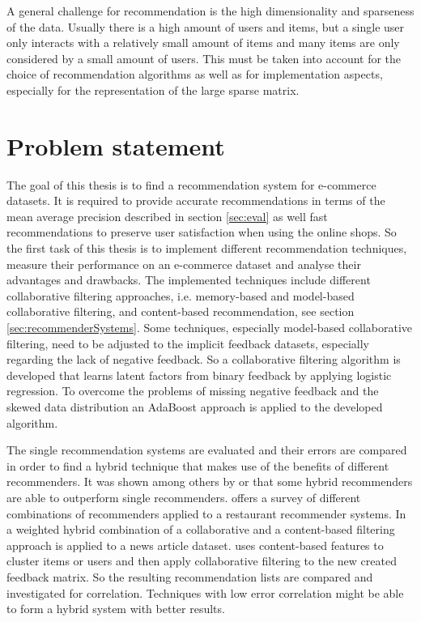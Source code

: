 \documentclass[10pt]{reportMaster}
\begin{document}
A general challenge for recommendation is the high dimensionality and sparseness of the data.
Usually there is a high amount of users and items, but a single user only interacts with a relatively small amount of items and many items are only considered by a small amount of users.
This must be taken into account for the choice of recommendation algorithms as well as for implementation aspects, especially for the representation of the large sparse matrix.


\section{Problem statement}
The goal of this thesis is to find a recommendation system for e-commerce datasets.
It is required to provide accurate recommendations in terms of the mean average precision described in section \ref{sec:eval} as well fast recommendations to preserve user satisfaction when using the online shops.
So the first task of this thesis is to implement different recommendation techniques, measure their performance on an e-commerce dataset and analyse their advantages and drawbacks.
The implemented techniques include different collaborative filtering approaches, i.e. memory-based and model-based collaborative filtering, and content-based recommendation, see section \ref{sec:recommenderSystems}.
Some techniques, especially model-based collaborative filtering, need to be adjusted to the implicit feedback datasets, especially regarding the lack of negative feedback.
So a collaborative filtering algorithm is developed that learns latent factors from binary feedback by applying logistic regression.
To overcome the problems of missing negative feedback and the skewed data distribution an AdaBoost approach is applied to the developed algorithm.

The single recommendation systems are evaluated and their errors are compared in order to find a hybrid technique that makes use of the benefits of different recommenders.
It was shown among others by \cite{hybridSurvey} or \cite{hybridcfcbClaypool} that some hybrid recommenders are able to outperform single recommenders.
\cite{hybridSurvey} offers a survey of different combinations of recommenders applied to a restaurant recommender systems.
In \cite{hybridcfcbClaypool} a weighted hybrid combination of a collaborative and a content-based filtering approach is applied to a news article dataset.
\cite{hybridCFCBClustringLi} uses content-based features to cluster items or users and then apply collaborative filtering to the new created feedback matrix. %
So the resulting recommendation lists are compared and investigated for correlation.
Techniques with low error correlation might be able to form a hybrid system with better results.
\end{document}
